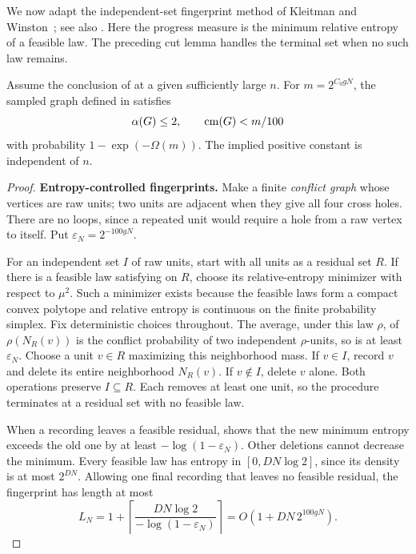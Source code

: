 We now adapt the independent-set fingerprint method of
Kleitman and Winston~\citep{kleitmanwinston1982}; see also
\citet[Section~2]{samotij2015}. Here the progress measure is the minimum
relative entropy of a feasible law. The preceding cut lemma handles
the terminal set when no such law remains.

\begin{proposition}\label{prop:raw-to-graph}
Assume the conclusion of  at a given sufficiently large \(n\).
For \(m=2^{C_0gN}\), the sampled graph defined in  satisfies
\[
 \alpha(G)\le2,\qquad \operatorname{cm}(G)<m/100
\]
with probability \(1-\exp(-\Omega(m))\).
The implied positive constant is independent of \(n\).
\end{proposition}
\begin{proof}
\textbf{Entropy-controlled fingerprints.}
Make a finite \emph{conflict graph} whose vertices are raw units; two units are adjacent when they give all four cross holes.
There are no loops, since a repeated unit would require a hole from a raw vertex to itself.
Put \(\varepsilon_N=2^{-100gN}\).

For an independent set \(I\) of raw units, start with all units as a residual set \(R\).
If there is a feasible law satisfying  on \(R\), choose its relative-entropy minimizer with respect to \(\mu^2\).
Such a minimizer exists because the feasible laws form a compact convex polytope and relative entropy is continuous on the finite probability simplex.
Fix deterministic choices throughout.
The average, under this law \(\rho\), of \(\rho(N_R(v))\) is the conflict probability of two independent \(\rho\)-units, so is at least \(\varepsilon_N\).
Choose a unit \(v\in R\) maximizing this neighborhood mass.
If \(v\in I\), record \(v\) and delete its entire neighborhood \(N_R(v)\).
If \(v\notin I\), delete \(v\) alone.
Both operations preserve \(I\subseteq R\).
Each removes at least one unit, so the procedure terminates at a residual set with no feasible law.

When a recording leaves a feasible residual,  shows that the new minimum entropy exceeds the old one by at least
\(-\log(1-\varepsilon_N)\).
Other deletions cannot decrease the minimum.
Every feasible law has entropy in \([0,DN\log2]\), since its density is at most \(2^{DN}\).
Allowing one final recording that leaves no feasible residual, the fingerprint has length at most
\begin{equation}\label{eq:fingerprint-length}
 L_N=1+\left\lceil
       \frac{DN\log2}{-\log(1-\varepsilon_N)}
      \right\rceil
 =O(1+DN\,2^{100gN}).
\end{equation}


\end{proof}
